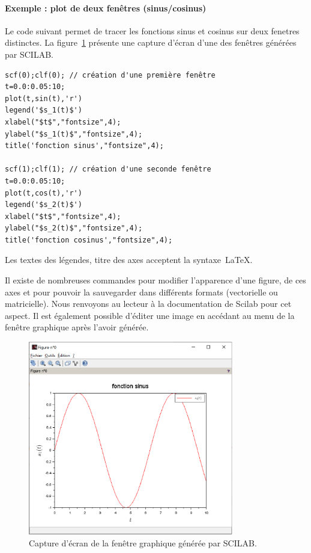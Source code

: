\paragraph{Exemple : plot de deux fenêtres (sinus/cosinus)}
Le code suivant permet de tracer les fonctions sinus et cosinus sur deux fenetres
distinctes. La figure~\cref{fig-capture-SCILAB} présente une capture d'écran 
d'une des fenêtres générées par SCILAB.

\begin{code}
\begin{verbatim}
scf(0);clf(0); // création d'une première fenêtre
t=0.0:0.05:10; 
plot(t,sin(t),'r')
legend('$s_1(t)$')
xlabel("$t$","fontsize",4);
ylabel("$s_1(t)$","fontsize",4);
title('fonction sinus',"fontsize",4);

scf(1);clf(1); // création d'une seconde fenêtre    
t=0.0:0.05:10;
plot(t,cos(t),'r')
legend('$s_2(t)$')
xlabel("$t$","fontsize",4);
ylabel("$s_2(t)$","fontsize",4);
title('fonction cosinus',"fontsize",4);  
\end{verbatim}
\end{code}
          
Les textes des légendes, titre des axes acceptent la syntaxe~\LaTeX.

Il existe de nombreuses commandes pour modifier l'apparence
d'une figure, de ces axes et pour pouvoir la sauvegarder
dans différents formats (vectorielle ou matricielle).
Nous renvoyons au lecteur à la documentation de Scilab pour
cet aspect. Il est également possible d'éditer une image en accédant
au menu de la fenêtre graphique après l'avoir générée.

\begin{figure}[!ht]
    \centering
    \includegraphics[width=0.8\textwidth]{fig/capture_SCILAB.eps}
    \caption{Capture d'écran de la fenêtre graphique générée par SCILAB.\label{fig-capture-SCILAB}}
\end{figure}


